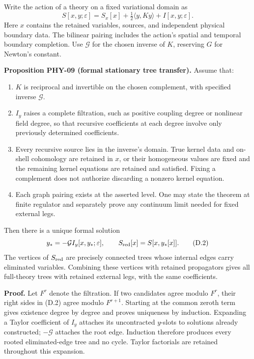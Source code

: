 \documentclass[a4paper,11pt]{article}
\numberwithin{equation}{section}
\providecommand{\tightlist}{\setlength{\itemsep}{0pt}\setlength{\parskip}{0pt}}
\begin{document}
Write the action of a theory on a fixed variational domain as \[
S[x,y;\varepsilon]
=S_x[x]+\tfrac12\langle y,Ky\rangle+I[x,y;\varepsilon].
\tag{D.1}
\] Here \(x\) contains the retained variables, sources, and independent physical boundary data. The bilinear pairing includes the action's spatial and temporal boundary completion. Use \(\mathcal G\) for the chosen inverse of \(K\), reserving \(G\) for Newton's constant.

\textbf{Proposition PHY-09 (formal stationary tree transfer).} Assume that:

\begin{enumerate}
\def\labelenumi{\arabic{enumi}.}
\tightlist
\item
  \(K\) is reciprocal and invertible on the chosen complement, with specified inverse \(\mathcal G\).
\item
  \(I_y\) raises a complete filtration, such as positive coupling degree or nonlinear field degree, so that recursive coefficients at each degree involve only previously determined coefficients.
\item
  Every recursive source lies in the inverse's domain. True kernel data and on-shell cohomology are retained in \(x\), or their homogeneous values are fixed and the remaining kernel equations are retained and satisfied. Fixing a complement does not authorize discarding a nonzero kernel equation.
\item
  Each graph pairing exists at the asserted level. One may state the theorem at finite regulator and separately prove any continuum limit needed for fixed external legs.
\end{enumerate}

Then there is a unique formal solution \[
y_*=-\mathcal G I_y[x,y_*;\varepsilon],
\qquad S_{\rm red}[x]=S[x,y_*[x]].
\tag{D.2}
\] The vertices of \(S_{\rm red}\) are precisely connected trees whose internal edges carry eliminated variables. Combining these vertices with retained propagators gives all full-theory trees with retained external legs, with the same coefficients.

\textbf{Proof.} Let \(F^r\) denote the filtration. If two candidates agree modulo \(F^r\), their right sides in (D.2) agree modulo \(F^{r+1}\). Starting at the common zeroth term gives existence degree by degree and proves uniqueness by induction. Expanding a Taylor coefficient of \(I_y\) attaches its uncontracted \(y\)-slots to solutions already constructed; \(-\mathcal G\) attaches the root edge. Induction therefore produces every rooted eliminated-edge tree and no cycle. Taylor factorials are retained throughout this expansion.
\end{document}
